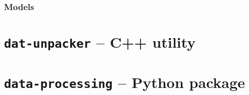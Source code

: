 \subsubsection{Models}

\section[\texttt{dat-unpacker}]{\texttt{dat-unpacker} -- C++ utility}

\section[\texttt{data-processing}]{\texttt{data-processing} -- Python package}

